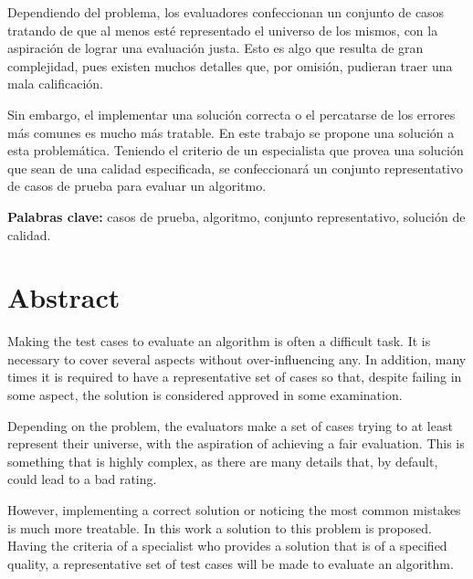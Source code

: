 \documentclass[a4paper,openright,11pt,oneside]{book}
\begin{document}
	Dependiendo del problema, los evaluadores confeccionan un conjunto de casos tratando de que al menos esté representado el universo de los mismos, con la aspiración de lograr una evaluación justa. Esto es algo que resulta de gran complejidad, pues existen muchos detalles que, por omisión, pudieran traer una mala calificación.
	
	Sin embargo, el implementar una solución correcta o el percatarse de los errores más comunes es mucho más tratable. En este trabajo se propone una solución a esta problemática. Teniendo el criterio de un especialista que provea una solución que sean de una calidad especificada, se confeccionará un conjunto representativo de casos de prueba para evaluar un algoritmo.
	
	
	\textbf{Palabras clave:} casos de prueba, algoritmo, conjunto representativo, solución de calidad.
	
\chapter*{Abstract}
	Making the test cases to evaluate an algorithm is often a difficult task. It is necessary to cover several aspects without over-influencing any. In addition, many times it is required to have a representative set of cases so that, despite failing in some aspect, the solution is considered approved in some examination.
	
	Depending on the problem, the evaluators make a set of cases trying to at least represent their universe, with the aspiration of achieving a fair evaluation. This is something that is highly complex, as there are many details that, by default, could lead to a bad rating.
	
	However, implementing a correct solution or noticing the most common mistakes is much more treatable. In this work a solution to this problem is proposed. Having the criteria of a specialist who provides a solution that is of a specified quality, a representative set of test cases will be made to evaluate an algorithm.
	
\end{document}
